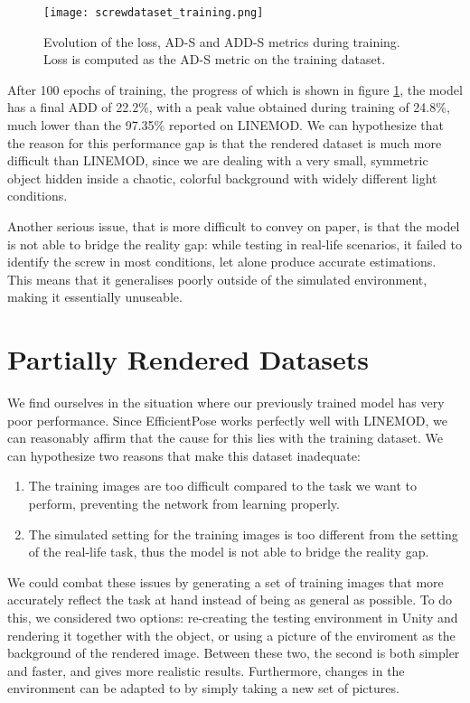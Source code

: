 \begin{figure}[ht]
    \texttt{[image: screwdataset\_training.png]}
    \caption{Evolution of the loss, AD-S and ADD-S metrics during training. Loss is computed as the AD-S metric on the training dataset.}
    \label{fig:screwdataset_training}
\end{figure}

After 100 epochs of training, the progress of which is shown in figure \ref{fig:screwdataset_training}, the model has a final ADD of 22.2\%, with a peak value obtained during training of 24.8\%, much lower than the 97.35\% reported on LINEMOD. We can hypothesize that the reason for this performance gap is that the rendered dataset is much more difficult than LINEMOD, since we are dealing with a very small, symmetric object hidden inside a chaotic, colorful background with widely different light conditions.

Another serious issue, that is more difficult to convey on paper, is that the model is not able to bridge the reality gap: while testing in real-life scenarios, it failed to identify the screw in most conditions, let alone produce accurate estimations. This means that it generalises poorly outside of the simulated environment, making it essentially unuseable.

\section{Partially Rendered Datasets}

We find ourselves in the situation where our previously trained model has very poor performance. Since EfficientPose works perfectly well with LINEMOD, we can reasonably affirm that the cause for this lies with the training dataset. We can hypothesize two reasons that make this dataset inadequate:

\begin{enumerate}
    \item The training images are too difficult compared to the task we want to perform, preventing the network from learning properly.
    \item The simulated setting for the training images is too different from the setting of the real-life task, thus the model is not able to bridge the reality gap.
\end{enumerate}

We could combat these issues by generating a set of training images that more accurately reflect the task at hand instead of being as general as possible. To do this, we considered two options: re-creating the testing environment in Unity and rendering it together with the object, or using a picture of the enviroment as the background of the rendered image. Between these two, the second is both simpler and faster, and gives more realistic results. Furthermore, changes in the environment can be adapted to by simply taking a new set of pictures.

